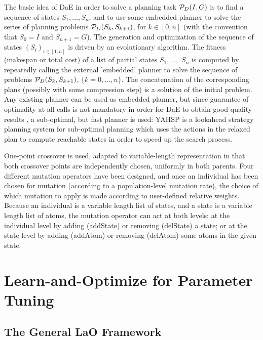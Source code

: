 \documentclass[runningheads,a4paper]{llncs}
\begin{document}
The basic idea of DaE in order to solve a planning task ${\cal P}_D(I,G)$ is to find a sequence of states $S_1, \ldots, S_n$, and to use some embedded planner to solve the series of planning problems ${\cal P}_D(S_{k},S_{k+1})$, for $k \in [0,n]$ (with the convention that $S_0 = I$ and $S_{n+1} = G$). The generation and optimization of the sequence of states $(S_i)_{i \in [1,n]}$ is driven by an evolutionary algorithm. 
The fitness (makespan or total cost) of a list of partial states $S_1, \ldots,$ $S_n$ is computed by repeatedly calling the external 'embedded' planner to solve the sequence of problems ${\cal P}_D(S_{k},S_{k+1})$, $\{k=0,\ldots,n\}$. The concatenation of the corresponding plans (possibly with some compression step) is a solution of the initial problem. Any existing planner can be used as embedded planner, but since guarantee of optimality at all calls is not mandatory in order for DaE to obtain good quality results \cite{Bibai:ICAPS2010}, a sub-optimal, but fast planner is used: YAHSP \cite{V:icaps04} is a lookahead strategy planning system for sub-optimal planning which uses the  actions in the relaxed plan to compute reachable states in order to speed up the search process. 

One-point crossover is used, adapted to variable-length representation in that both crossover points are independently chosen, uniformly in both parents.
Four different mutation operators have been designed, and once an individual has been chosen for mutation (according to a population-level mutation rate), the choice of which mutation to apply is made according to user-defined relative weights. Because an individual is a variable length list of states, and a state is a variable length list of atoms, the mutation operator can act at both levels: at the individual level by adding (addState) or removing (delState) 
a state; or at the state level by adding (addAtom) or removing (delAtom) some atoms in the given state. 


\section{Learn-and-Optimize for Parameter Tuning}
\label{section:LaO}

\subsection{The General LaO Framework}
\end{document}

